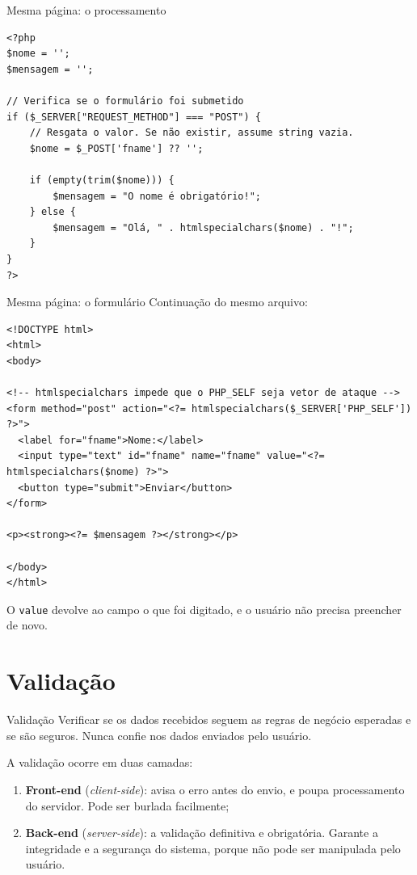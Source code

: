 \documentclass{beamer}
\begin{document}
\begin{frame}[fragile]{Mesma página: o processamento}
	\begin{verbatim}
<?php
$nome = '';
$mensagem = '';

// Verifica se o formulário foi submetido
if ($_SERVER["REQUEST_METHOD"] === "POST") {
    // Resgata o valor. Se não existir, assume string vazia.
    $nome = $_POST['fname'] ?? '';

    if (empty(trim($nome))) {
        $mensagem = "O nome é obrigatório!";
    } else {
        $mensagem = "Olá, " . htmlspecialchars($nome) . "!";
    }
}
?>
	\end{verbatim}
\end{frame}

\begin{frame}[fragile]{Mesma página: o formulário}
	Continuação do mesmo arquivo:

	\begin{verbatim}
<!DOCTYPE html>
<html>
<body>

<!-- htmlspecialchars impede que o PHP_SELF seja vetor de ataque -->
<form method="post" action="<?= htmlspecialchars($_SERVER['PHP_SELF']) ?>">
  <label for="fname">Nome:</label>
  <input type="text" id="fname" name="fname" value="<?= htmlspecialchars($nome) ?>">
  <button type="submit">Enviar</button>
</form>

<p><strong><?= $mensagem ?></strong></p>

</body>
</html>
	\end{verbatim}

	O \texttt{value} devolve ao campo o que foi digitado, e o usuário não
	precisa preencher de novo.
\end{frame}

\section{Validação}

\begin{frame}{Validação}
	Verificar se os dados recebidos seguem as regras de negócio esperadas e se
	são seguros. Nunca confie nos dados enviados pelo usuário.

	\vspace{0.3cm}
	A validação ocorre em duas camadas:
	\begin{enumerate}
		\item \textbf{Front-end} (\emph{client-side}): avisa o erro antes do
		      envio, e poupa processamento do servidor. Pode ser burlada
		      facilmente;
		\item \textbf{Back-end} (\emph{server-side}): a validação definitiva e
		      obrigatória. Garante a integridade e a segurança do sistema, porque
		      não pode ser manipulada pelo usuário.
	\end{enumerate}
\end{frame}
\end{document}
